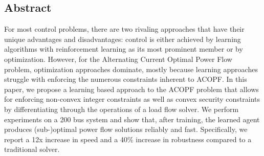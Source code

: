 

\subsection{Abstract}
For most control problems, there are two rivaling approaches that have their unique advantages and disadvantages: control is either achieved by learning algorithms with reinforcement learning as its most prominent member or by optimization. However, for the Alternating Current Optimal Power Flow problem, optimization approaches dominate, mostly because learning approaches struggle with enforcing the numerous constraints inherent to ACOPF. In this paper, we propose a learning based approach to the ACOPF problem that allows for enforcing non-convex integer constraints as well as convex security constraints by differentiating through the operations of a load flow solver. We perform experiments on a 200 bus system and show that, after training, the learned agent produces (sub-)optimal power flow solutions reliably and fast. Specifically, we report a 12x increase in speed and a 40\% increase in robustness compared to a traditional solver.






